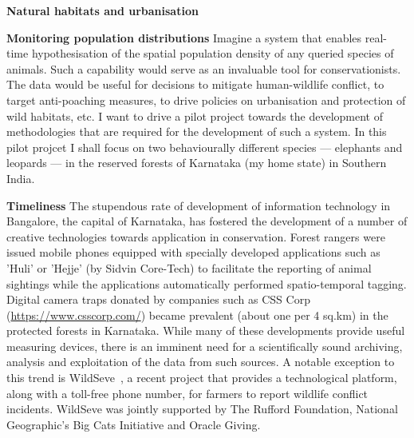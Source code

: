 \documentclass[a4paper,10pt,twocolumn]{article}
\newcommand{\hdg}[1] {\noindent \textbf{#1} }
\begin{document}
{ 
\Large 
{}%
}


\hdg{Natural habitats and urbanisation}

\hdg{Monitoring population distributions}
Imagine a system that enables real-time hypothesisation of the spatial population density of any queried species of animals. Such a capability would serve as an invaluable tool for conservationists. The data would be useful for decisions to mitigate human-wildlife conflict, to target anti-poaching measures, to drive policies on urbanisation and protection of wild habitats, etc. I want to drive a pilot project towards the development of methodologies that are required for the development of such a system. In this pilot projcet I shall focus on two behaviourally different species --- elephants and leopards --- in the reserved forests of Karnataka (my home state) in Southern India. 


\hdg{Timeliness}
The stupendous rate of development of information technology in Bangalore, the capital of Karnataka, has fostered the development of a number of creative technologies towards application in conservation. Forest rangers were issued mobile phones equipped with specially developed applications such as 'Huli' or 'Hejje' (by Sidvin Core-Tech) to facilitate the reporting of animal sightings while the applications automatically performed spatio-temporal tagging. Digital camera traps donated by companies such as CSS Corp (\url{https://www.csscorp.com/}) became prevalent (about one per 4 sq.km) in the protected forests in Karnataka. While many of these developments provide useful measuring devices, there is an imminent need for a scientifically sound archiving, analysis and exploitation of the data from such sources. A notable exception to this trend is WildSeve~\cite{}, a recent project that provides a technological platform, along with a toll-free phone number, for farmers to report wildlife conflict incidents. WildSeve was jointly supported by The Rufford Foundation, National Geographic's Big Cats Initiative and Oracle Giving.
\end{document}
